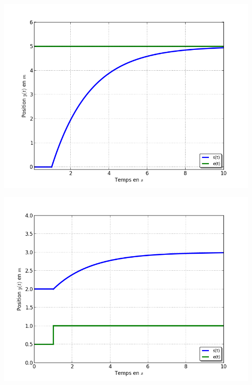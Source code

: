 \documentclass[11pt,oneside]{article}
\begin{document}
\begin{minipage}[c]{.49\linewidth}
\begin{center}
\includegraphics[width=\textwidth]{png/courbe3}
\end{center}
\end{minipage}\hfill
\begin{minipage}[c]{.49\linewidth}
\begin{center}
\includegraphics[width=\textwidth]{png/courbe4}
\end{center}
\end{minipage}
\end{document}
